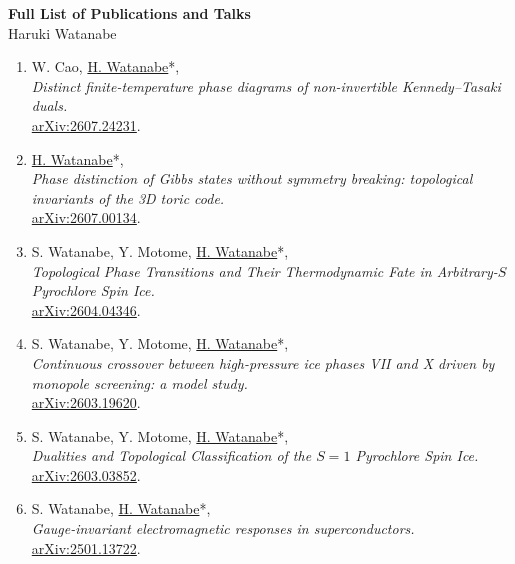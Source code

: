 \documentclass[letterpaper,11pt]{article}
\begin{document}
\begin{center}
    {\Large \textbf{Full List of Publications and Talks}}\\[0.15cm]
    {\large Haruki Watanabe}
\end{center}

\vspace{0.3cm}

\begin{enumerate}

\section*{Preprints}

\item W. Cao, \underline{H. Watanabe}*, \\\emph{Distinct finite-temperature phase diagrams of non-invertible Kennedy--Tasaki duals.}\\{\href{https://arxiv.org/abs/2607.24231}{arXiv:2607.24231}.}

\item \underline{H. Watanabe}*, \\\emph{Phase distinction of Gibbs states without symmetry breaking: topological invariants of the 3D toric code.}\\{\href{https://arxiv.org/abs/2607.00134}{arXiv:2607.00134}.}

\item S. Watanabe, Y. Motome, \underline{H. Watanabe}*, \\\emph{Topological Phase Transitions and Their Thermodynamic Fate in Arbitrary-$S$ Pyrochlore Spin Ice.}\\{\href{https://arxiv.org/abs/2604.04346}{arXiv:2604.04346}.}

\item S. Watanabe, Y. Motome, \underline{H. Watanabe}*, \\\emph{Continuous crossover between high-pressure ice phases VII and X driven by monopole screening: a model study.}\\{\href{https://arxiv.org/abs/2603.19620}{arXiv:2603.19620}.}

\item S. Watanabe, Y. Motome, \underline{H. Watanabe}*, \\\emph{Dualities and Topological Classification of the $S=1$ Pyrochlore Spin Ice.}\\{\href{https://arxiv.org/abs/2603.03852}{arXiv:2603.03852}.}

\item S. Watanabe, \underline{H. Watanabe}*, \\\emph{Gauge-invariant electromagnetic responses in superconductors.}\\{\href{https://arxiv.org/abs/2501.13722}{arXiv:2501.13722}.}


\end{enumerate}
\end{document}
